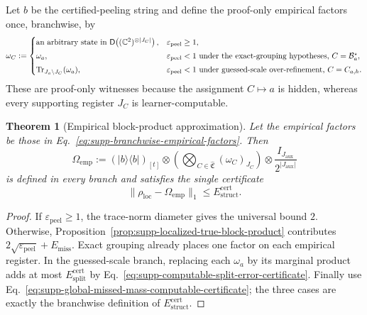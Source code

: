 \documentclass[
  aps,
  prx,
  reprint,
  superscriptaddress,
  amsmath,
  amssymb,
  nofootinbib,
  longbibliography
]{revtex4-2}
\newtheorem{theorem}{Theorem}
\newcommand{\D}{\mathsf{D}}
\begin{document}
Let $b$ be the certified-peeling string and define the proof-only empirical
factors once, branchwise, by
\begin{equation}
\omega_C
:=
\begin{cases}
\text{an arbitrary state in }
\D\!\left((\mathbb C^2)^{\otimes |J_C|}\right),
&\varepsilon_{\mathrm{peel}}\ge1,\\[1mm]
\omega_a,
&\varepsilon_{\mathrm{peel}}<1\text{ under the exact-grouping hypotheses, }
C=\mathcal B_a^\star,\\[1mm]
\Tr_{J_a\setminus J_C}(\omega_a),
&\varepsilon_{\mathrm{peel}}<1\text{ under guessed-scale over-refinement, }
C=C_{a,h}.
\end{cases}
\label{eq:supp-branchwise-empirical-factors}
\end{equation}
These are proof-only witnesses because the assignment $C\mapsto a$ is
hidden, whereas every supporting register $J_C$ is learner-computable.

\begin{theorem}[Empirical block-product approximation]
\label{thm:supp-empirical-block-product-approximation}
Let the empirical factors be those in
Eq.~\eqref{eq:supp-branchwise-empirical-factors}.  Then
\begin{equation}
\Omega_{\mathrm{emp}}
:=
\left(|b\rangle\!\langle b|\right)_{[t]}
\otimes
\left(
\bigotimes_{C\in\widehat{\mathfrak C}}
\left(\omega_C\right)_{J_C}
\right)
\otimes
\frac{I_{J_{\mathrm{aux}}}}{2^{|J_{\mathrm{aux}}|}}
\label{eq:supp-empirical-block-product-witness}
\end{equation}
is defined in every branch and satisfies the single certificate
\begin{equation}
\|\rho_{\mathrm{loc}}-\Omega_{\mathrm{emp}}\|_1
\le E_{\mathrm{struct}}^{\mathrm{cert}}.
\end{equation}
\end{theorem}

\begin{proof}
If $\varepsilon_{\mathrm{peel}}\ge1$, the trace-norm diameter gives the
universal bound $2$.  Otherwise,
Proposition~\ref{prop:supp-localized-true-block-product} contributes
$2\sqrt{\varepsilon_{\mathrm{peel}}}+E_{\mathrm{miss}}$.  Exact grouping
already places one factor on each empirical register.  In the guessed-scale
branch, replacing each $\omega_a$ by its marginal product adds at most
$E_{\mathrm{split}}^{\mathrm{cert}}$ by
Eq.~\eqref{eq:supp-computable-split-error-certificate}.  Finally use
Eq.~\eqref{eq:supp-global-missed-mass-computable-certificate}; the three
cases are exactly the branchwise definition of
$E_{\mathrm{struct}}^{\mathrm{cert}}$.
\end{proof}
\end{document}
